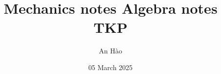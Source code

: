 \usepackage[utf8]{inputenc}
\usepackage[T1]{fontenc}

\usepackage{blindtext} %
\usepackage{color,soul} %
\usepackage[dvipsnames]{xcolor} %
\usepackage{tcolorbox}

\usepackage{amsmath, booktabs}
\usepackage{amsthm}
\usepackage{amssymb}
\usepackage{amsfonts}
\usepackage{mathtools}

\usepackage{graphicx}
\usepackage{subcaption}
\graphicspath{ {./figures/} {./figures/intermediate-algebra-course/} {./figures/beginning-algebra-course/} }


\usepackage{tikz}



\usepackage[
  left=20mm,
  right=20mm,
  top=25mm,
  bottom=25mm,
  headsep=10mm,
  footskip=15mm,
]{geometry}

\usepackage{fancyhdr}
\usepackage{lastpage}

\pagestyle{fancy}
\fancyhf{} %
\renewcommand{\headrulewidth}{0pt} %

\lhead{\leftmark}
\rhead{\thepage}

\renewcommand{\baselinestretch}{1.2}

\setlength{\parskip}{1.3mm}

\usepackage[vietnamese=nohyphenation]{hyphsubst} %
\usepackage[vietnamese]{babel}

\usepackage{hyperref} %
    

\usepackage{subfiles} %

\title{Mechanics notes}
\title{
	{Algebra notes}\\
	{\large TKP}\\
}
\author{An Hào}
\date{05 March 2025}
